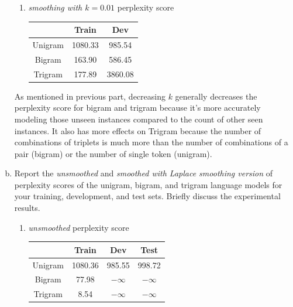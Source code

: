 \documentclass{article}
\newenvironment{solution}{\color{blue}}{}
\begin{document}
\begin{enumerate}[(a)]
\begin{solution}
\begin{enumerate}[1.]
      \item \textit{smoothing with $k = 0.01$} perplexity score
      \begin{center}
        \begin{tabular}{| c | c | c |}
          \hline
          & Train & Dev \\ \hline
          Unigram & 1080.33 & 985.54 \\ \hline
          Bigram & 163.90 & 586.45 \\ \hline
          Trigram & 177.89 & 3860.08 \\ \hline
        \end{tabular}
      \end{center}
    \end{enumerate}

    As mentioned in previous part, decreasing $k$ generally decreases the perplexity 
    score for bigram and trigram because it's more accurately modeling those unseen 
    instances compared to the count of other seen instances. It also has more effects on Trigram because the number 
    of combinations of triplets is much more than the number of combinations of a pair (bigram) or the number of single token (unigram).

  \end{solution}
  
  \item Report the \textit{unsmoothed} and \textit{smoothed with Laplace smoothing version} of
  perplexity scores of the unigram, bigram, and trigram language models for your training, 
  development, and test sets. Briefly discuss the experimental results.

  \begin{solution}
    \begin{enumerate}[1.]
      \item \textit{unsmoothed} perplexity score
      \begin{center}
        \begin{tabular}{| c | c | c | c |}
          \hline
          & Train & Dev & Test \\ \hline
          Unigram & 1080.36 & 985.55 & 998.72 \\ \hline
          Bigram & 77.98 & $-\infty$ & $-\infty$ \\ \hline
          Trigram & 8.54 & $-\infty$ & $-\infty$ \\ \hline
        \end{tabular}
      \end{center}


\end{enumerate}
\end{solution}
\end{enumerate}
\end{document}
